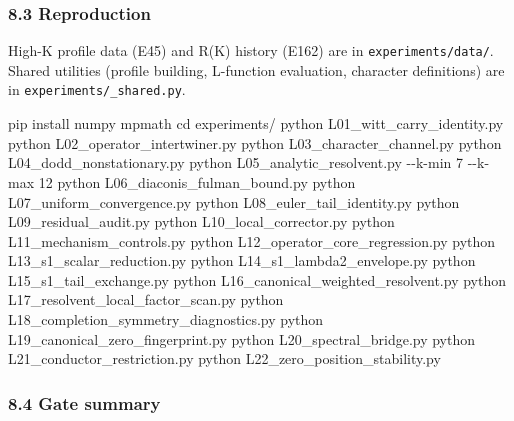 \documentclass[
  11pt,
]{article}
\newenvironment{Shaded}{}{}
\newcommand{\AttributeTok}[1]{\textcolor[rgb]{0.49,0.56,0.16}{#1}}
\newcommand{\BuiltInTok}[1]{\textcolor[rgb]{0.00,0.50,0.00}{#1}}
\newcommand{\ExtensionTok}[1]{#1}
\newcommand{\NormalTok}[1]{#1}
\begin{document}
\subsubsection{8.3 Reproduction}\label{reproduction}

High-K profile data (E45) and R(K) history (E162) are in
\texttt{experiments/data/}. Shared utilities (profile building, L-function
evaluation, character definitions) are in \texttt{experiments/\_shared.py}.

\begin{Shaded}
\begin{Highlighting}[]
\ExtensionTok{pip}\NormalTok{ install numpy mpmath}
\BuiltInTok{cd}\NormalTok{ experiments/}
\ExtensionTok{python}\NormalTok{ L01\_witt\_carry\_identity.py}
\ExtensionTok{python}\NormalTok{ L02\_operator\_intertwiner.py}
\ExtensionTok{python}\NormalTok{ L03\_character\_channel.py}
\ExtensionTok{python}\NormalTok{ L04\_dodd\_nonstationary.py}
\ExtensionTok{python}\NormalTok{ L05\_analytic\_resolvent.py }\AttributeTok{{-}{-}k{-}min}\NormalTok{ 7 }\AttributeTok{{-}{-}k{-}max}\NormalTok{ 12}
\ExtensionTok{python}\NormalTok{ L06\_diaconis\_fulman\_bound.py}
\ExtensionTok{python}\NormalTok{ L07\_uniform\_convergence.py}
\ExtensionTok{python}\NormalTok{ L08\_euler\_tail\_identity.py}
\ExtensionTok{python}\NormalTok{ L09\_residual\_audit.py}
\ExtensionTok{python}\NormalTok{ L10\_local\_corrector.py}
\ExtensionTok{python}\NormalTok{ L11\_mechanism\_controls.py}
\ExtensionTok{python}\NormalTok{ L12\_operator\_core\_regression.py}
\ExtensionTok{python}\NormalTok{ L13\_s1\_scalar\_reduction.py}
\ExtensionTok{python}\NormalTok{ L14\_s1\_lambda2\_envelope.py}
\ExtensionTok{python}\NormalTok{ L15\_s1\_tail\_exchange.py}
\ExtensionTok{python}\NormalTok{ L16\_canonical\_weighted\_resolvent.py}
\ExtensionTok{python}\NormalTok{ L17\_resolvent\_local\_factor\_scan.py}
\ExtensionTok{python}\NormalTok{ L18\_completion\_symmetry\_diagnostics.py}
\ExtensionTok{python}\NormalTok{ L19\_canonical\_zero\_fingerprint.py}
\ExtensionTok{python}\NormalTok{ L20\_spectral\_bridge.py}
\ExtensionTok{python}\NormalTok{ L21\_conductor\_restriction.py}
\ExtensionTok{python}\NormalTok{ L22\_zero\_position\_stability.py}
\end{Highlighting}
\end{Shaded}

\subsubsection{8.4 Gate summary}\label{gate-summary}
\end{document}
